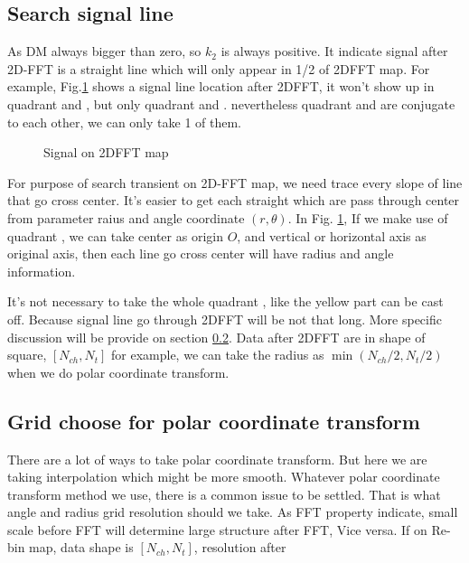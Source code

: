\documentclass[twocolumn]{aastex61}
\begin{document}
\subsection{Search signal line}

As DM always bigger than zero, so $k_2$ is always positive. It indicate signal after 2D-FFT is a straight line which will only appear in 1/2 of 2DFFT map. For example, Fig.\ref{fig:2DFFT} shows a signal line location after 2DFFT, it won't show up in quadrant \uppercase\expandafter{} and  \uppercase\expandafter{}, but only quadrant \uppercase\expandafter{} and \uppercase\expandafter{}. nevertheless quadrant \uppercase\expandafter{} and \uppercase\expandafter{} are conjugate to each other, we can only take 1 of them.

\begin{figure}[ht!]
\caption{Signal on 2DFFT map \label{fig:2DFFT}}
\end{figure}

For purpose of search transient on 2D-FFT map, we need trace every slope of line that go cross center. It's easier to get each straight which are pass through center from parameter raius and angle  coordinate $(r,\theta)$. In Fig. \ref{fig:2DFFT},  If we make use of quadrant \uppercase\expandafter{}, we can take center as origin $O$, and vertical or horizontal axis as original axis, then each line go cross center will have radius and angle information. 

It's not necessary to take the whole quadrant \uppercase\expandafter{}, like the yellow part can be cast off. Because signal line go through 2DFFT will be not that long. More specific discussion will be provide on section \ref{sec:parameter of polar transf}. Data after 2DFFT are in shape of square, $[N_{ch},N_t]$ for example, we can take the radius as ${\min(N_{ch}/2,N_t/2)}$ when we do polar coordinate transform. 
\subsection{Grid choose for polar coordinate transform}\label{sec:parameter of polar transf}
There are a lot of ways to take polar coordinate transform. But here we are taking interpolation which might be more smooth. Whatever polar coordinate transform method we use, there is a common issue to be settled. That is what angle and radius grid resolution should we take. As FFT property indicate, small scale before FFT will determine large structure after FFT, Vice versa. If on Re-bin map, data shape is $[N_{ch},N_t]$, resolution after 
\end{document}
